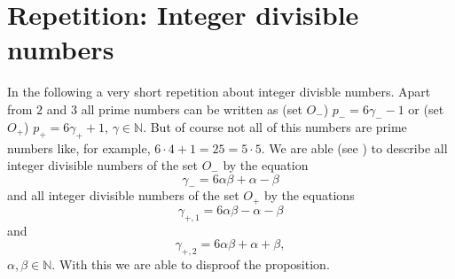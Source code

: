 \documentclass{amsart}
\begin{document}
\section{Repetition: Integer divisible numbers}
\label{s:repetition}
In the following a very short repetition about integer divisble numbers. Apart from $2$ and $3$ all prime numbers can be written as (set $O_{-}$) $p_{-} = 6\gamma_{-} - 1$ or (set $O_{+}$) $p_{+} = 6\gamma_{+} + 1$, $\gamma \in \mathbb{N}$. But of course not all of this numbers are prime numbers like, for example, $6\cdot4 + 1 = 25 = 5 \cdot 5$. We are able (see \cite{CaZoeb}) to describe all integer divisible numbers of the set $O_{-}$ by the equation
\begin{equation}
	\gamma_{-} = 6\alpha\beta + \alpha - \beta
\label{eq:set-_eq+-}\end{equation}
and all integer divisible numbers of the set $O_{+}$ by the equations
\begin{equation}
	\gamma_{+,1} = 6\alpha\beta - \alpha - \beta
\label{eq:set+_eq--}\end{equation}
and
\begin{equation}
	\gamma_{+,2} = 6\alpha\beta + \alpha + \beta,
\label{eq:set+_eq++}\end{equation}
$\alpha, \beta \in \mathbb{N}$. With this we are able to disproof the proposition.
\end{document}
